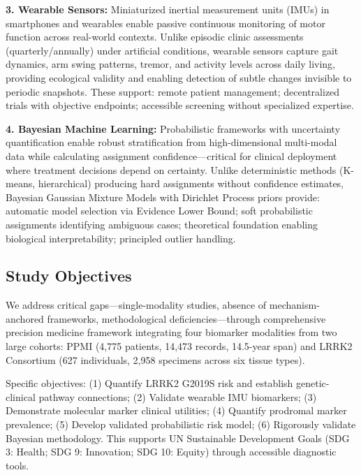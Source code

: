 \documentclass[11pt]{article}
\begin{document}
\textbf{3. Wearable Sensors:} Miniaturized inertial measurement units (IMUs) in smartphones and wearables enable passive continuous monitoring of motor function across real-world contexts\cite{mirelman2024wearable,adams2024using,horak2015objective}. Unlike episodic clinic assessments (quarterly/annually) under artificial conditions, wearable sensors capture gait dynamics, arm swing patterns, tremor, and activity levels across daily living, providing ecological validity and enabling detection of subtle changes invisible to periodic snapshots\cite{espay2024disease,martinez2024digital}. These support: remote patient management; decentralized trials with objective endpoints; accessible screening without specialized expertise.

\textbf{4. Bayesian Machine Learning:} Probabilistic frameworks with uncertainty quantification enable robust stratification from high-dimensional multi-modal data while calculating assignment confidence—critical for clinical deployment where treatment decisions depend on certainty\cite{zhang2023machine,collins2024tripod}. Unlike deterministic methods (K-means, hierarchical) producing hard assignments without confidence estimates, Bayesian Gaussian Mixture Models with Dirichlet Process priors provide: automatic model selection via Evidence Lower Bound; soft probabilistic assignments identifying ambiguous cases; theoretical foundation enabling biological interpretability; principled outlier handling.

\subsection*{Study Objectives}

We address critical gaps—single-modality studies, absence of mechanism-anchored frameworks, methodological deficiencies—through comprehensive precision medicine framework integrating four biomarker modalities from two large cohorts: PPMI (4,775 patients, 14,473 records, 14.5-year span)\cite{marek2018parkinson} and LRRK2 Consortium (627 individuals, 2,958 specimens across six tissue types)\cite{marder2015age,west2023lrrk2}.

Specific objectives: (1) Quantify LRRK2 G2019S risk and establish genetic-clinical pathway connections; (2) Validate wearable IMU biomarkers; (3) Demonstrate molecular marker clinical utilities; (4) Quantify prodromal marker prevalence; (5) Develop validated probabilistic risk model; (6) Rigorously validate Bayesian methodology. This supports UN Sustainable Development Goals (SDG 3: Health; SDG 9: Innovation; SDG 10: Equity) through accessible diagnostic tools.
\end{document}
